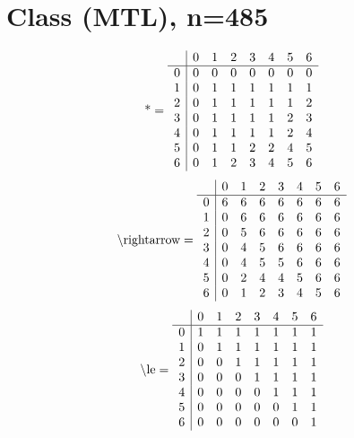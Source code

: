 \documentclass[11pt]{article}
\begin{document}
\section{Class (MTL), n=485}
\[\text{*} = 
\begin{array}{r | r r r r r r r}
 & 0 & 1 & 2 & 3 & 4 & 5 & 6 \\ \hline
0 & 0 & 0 & 0 & 0 & 0 & 0 & 0 \\
1 & 0 & 1 & 1 & 1 & 1 & 1 & 1 \\
2 & 0 & 1 & 1 & 1 & 1 & 1 & 2 \\
3 & 0 & 1 & 1 & 1 & 1 & 2 & 3 \\
4 & 0 & 1 & 1 & 1 & 1 & 2 & 4 \\
5 & 0 & 1 & 1 & 2 & 2 & 4 & 5 \\
6 & 0 & 1 & 2 & 3 & 4 & 5 & 6 \\
\end{array}
\]
\[\text{\textbackslash rightarrow} = 
\begin{array}{r | r r r r r r r}
 & 0 & 1 & 2 & 3 & 4 & 5 & 6 \\ \hline
0 & 6 & 6 & 6 & 6 & 6 & 6 & 6 \\
1 & 0 & 6 & 6 & 6 & 6 & 6 & 6 \\
2 & 0 & 5 & 6 & 6 & 6 & 6 & 6 \\
3 & 0 & 4 & 5 & 6 & 6 & 6 & 6 \\
4 & 0 & 4 & 5 & 5 & 6 & 6 & 6 \\
5 & 0 & 2 & 4 & 4 & 5 & 6 & 6 \\
6 & 0 & 1 & 2 & 3 & 4 & 5 & 6 \\
\end{array}
\]
\[\text{\textbackslash le} = 
\begin{array}{r | r r r r r r r}
 & 0 & 1 & 2 & 3 & 4 & 5 & 6 \\ \hline
0 & 1 & 1 & 1 & 1 & 1 & 1 & 1 \\
1 & 0 & 1 & 1 & 1 & 1 & 1 & 1 \\
2 & 0 & 0 & 1 & 1 & 1 & 1 & 1 \\
3 & 0 & 0 & 0 & 1 & 1 & 1 & 1 \\
4 & 0 & 0 & 0 & 0 & 1 & 1 & 1 \\
5 & 0 & 0 & 0 & 0 & 0 & 1 & 1 \\
6 & 0 & 0 & 0 & 0 & 0 & 0 & 1 \\
\end{array}
\]
\end{document}
